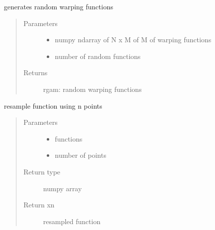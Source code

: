 \documentclass[letterpaper,10pt,english]{sphinxmanual}
\begin{document}
\begin{fulllineitems}
\label{\detokenize{utility_functions:utility_functions.randomGamma}}
generates random warping functions
\begin{quote}\begin{description}
\item[{Parameters}] \leavevmode\begin{itemize}
\item {} 
 \textendash{} numpy ndarray of N x M of M of warping functions

\item {} 
 \textendash{} number of random functions

\end{itemize}

\item[{Returns}] \leavevmode
rgam: random warping functions

\end{description}\end{quote}

\end{fulllineitems}


\begin{fulllineitems}
\label{\detokenize{utility_functions:utility_functions.resamplefunction}}
resample function using n points
\begin{quote}\begin{description}
\item[{Parameters}] \leavevmode\begin{itemize}
\item {} 
 \textendash{} functions

\item {} 
 \textendash{} number of points

\end{itemize}

\item[{Return type}] \leavevmode
numpy array

\item[{Return xn}] \leavevmode
resampled function

\end{description}\end{quote}

\end{fulllineitems}
\end{document}
